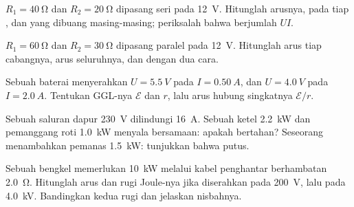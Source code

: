 \begin{exercise}[$\star\star$]\label{exo:g11:circuits-and-power:7}
$R_1 = \qty{40}{\ohm}$ dan $R_2 = \qty{20}{\ohm}$ dipasang seri pada
\qty{12}{V}. Hitunglah arusnya,  pada tiap , dan
 yang dibuang masing-masing; periksalah bahwa  berjumlah
$UI$.
\end{exercise}

\begin{exercise}[$\star\star$]\label{exo:g11:circuits-and-power:8}
$R_1 = \qty{60}{\ohm}$ dan $R_2 = \qty{30}{\ohm}$ dipasang paralel pada
\qty{12}{V}. Hitunglah arus tiap cabangnya, arus seluruhnya, dan
 dengan dua cara.
\end{exercise}

\begin{exercise}[$\star\star$]\label{exo:g11:circuits-and-power:9}
Sebuah baterai menyerahkan $U = \qty{5.5}{V}$ pada $I = \qty{0.50}{A}$,
dan $U = \qty{4.0}{V}$ pada $I = \qty{2.0}{A}$. Tentukan GGL-nya
$\mathcal{E}$ dan  $r$, lalu arus hubung singkatnya
$\mathcal{E}/r$.
\end{exercise}

\begin{exercise}[$\star\star$]\label{exo:g11:circuits-and-power:10}
Sebuah saluran dapur \qty{230}{V} dilindungi  \qty{16}{A}. Sebuah
ketel \qty{2.2}{kW} dan pemanggang roti \qty{1.0}{kW} menyala bersamaan:
apakah  bertahan? Seseorang menambahkan pemanas \qty{1.5}{kW}:
tunjukkan bahwa  putus.
\end{exercise}

\begin{exercise}[$\star\star$]\label{exo:g11:circuits-and-power:11}
Sebuah bengkel memerlukan \qty{10}{kW} melalui kabel penghantar
berhambatan \qty{2.0}{\ohm}. Hitunglah arus dan rugi Joule-nya jika
 diserahkan pada \qty{200}{V}, lalu pada \qty{4.0}{kV}.
Bandingkan kedua rugi  dan jelaskan nisbahnya.
\end{exercise}

